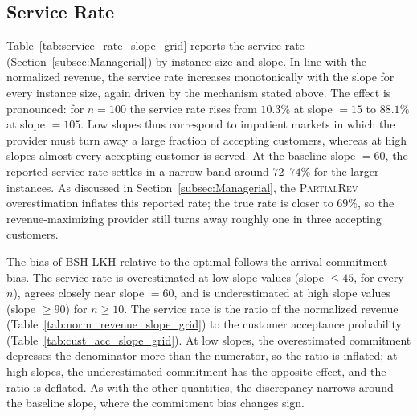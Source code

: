 \documentclass[11pt]{article}
\theoremstyle{plain}
\theoremstyle{definition}
\begin{document}
\subsection{Service Rate}
Table~\ref{tab:service_rate_slope_grid} reports the service rate
(Section~\ref{subsec:Managerial}) by instance size and slope. In line with the
normalized revenue, the service rate increases monotonically with the slope for every
instance size, again driven by the mechanism stated above. The effect is
pronounced: for $n = 100$ the service rate rises from $10.3\%$ at slope $= 15$ to $88.1\%$
at slope $= 105$. Low slopes thus correspond to impatient markets in which the provider
must turn away a large fraction of accepting customers, whereas at high slopes almost every
accepting customer is served. At the baseline slope $= 60$, the reported service rate
settles in a narrow band around $72$--$74\%$ for the larger instances. As discussed in
Section~\ref{subsec:Managerial}, the \textsc{PartialRev} overestimation inflates this
reported rate; the true rate is closer to $69\%$, so the revenue-maximizing provider still
turns away roughly one in three accepting customers.

The bias of BSH-\ac{LKH} relative to the optimal follows the arrival commitment bias. The
service rate is overestimated at low slope values (slope $\leq 45$, for every $n$), agrees
closely near slope $= 60$, and is underestimated at high slope values (slope $\geq 90$) for $n \geq 10$. 
The service rate is the ratio of the normalized revenue
(Table~\ref{tab:norm_revenue_slope_grid}) to the customer acceptance probability
(Table~\ref{tab:cust_acc_slope_grid}). At low slopes, the overestimated commitment
depresses the denominator more than the numerator, so the ratio is inflated; at high
slopes, the underestimated commitment has the opposite effect, and the ratio is deflated.
As with the other quantities, the discrepancy narrows around
the baseline slope, where the commitment bias changes sign.
\end{document}
